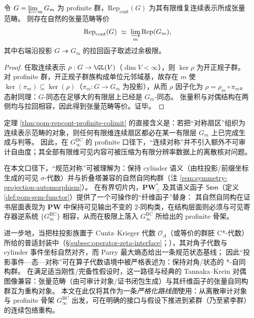 \begin{theorem}\label{thm:pom-repcont-profinite-colimit}
令 \(G=\varprojlim_m G_m\) 为 profinite 群，\(\mathrm{Rep}_{\mathrm{cont}}(G)\) 为其有限维复连续表示所成张量范畴。
则存在自然的张量范畴等价
\[
\mathrm{Rep}_{\mathrm{cont}}(G)\ \simeq\ \varinjlim_m \mathrm{Rep}(G_m),
\]
其中右端沿投影 \(G\twoheadrightarrow G_m\) 的拉回函子取滤过余极限。
\end{theorem}
\begin{proof}
任取连续表示 \(\rho:G\to\GL(V)\)（\(\dim V<\infty\)），则 \(\ker\rho\) 为开正规子群。
对 profinite 群，开正规子群族构成单位元邻域基，故存在 \(m\) 使 \(\ker(\pi_m)\subseteq\ker(\rho)\)（\(\pi_m:G\to G_m\) 为投影），从而 \(\rho\) 因子化为 \(\rho=\rho_m\circ \pi_m\)。
态射同理：\(G\)-同态在足够大的有限层上已经是 \(G_m\)-同态。
张量积与对偶结构在两侧均与拉回相容，因此得到张量范畴等价。证毕。
\end{proof}

\begin{remark}\label{rem:pom-profinite-sector-generated-by-finite-layers}
定理 \ref{thm:pom-repcont-profinite-colimit} 的直接含义是：若把“对称扇区”组织为连续表示范畴的对象，则任何有限维连续扇区都必在某一有限层 \(G_m\) 上已完成生成与判等。
因此，在 \(G_\infty^{\mathrm{BC}}\) 的 profinite 口径下，“连续对称”并不引入额外不可审计自由度；其全部有限维可见内容可被压缩为有限分辨率数据上的离散核对问题。
\end{remark}

\begin{remark}\label{rem:pom-tannaka-krein-roadmap}
在本文口径下，“规范对称”可被理解为：保持 cylinder 语义（由柱投影/前缀坐标生成的可见 \(\sigma\)-代数）并与折叠塔兼容的自然自同构群（注 \ref{rem:symmetry-projection-automorphism}）。
在有界切片内，\(\mathbf{PW}^{\ast}_{\le}\) 及其语义函子 \(\mathsf{Sem}\)（定义 \ref{def:pom-sem-functor}）提供了一个可操作的“纤维函子”替身：
其自然自同构在证书层面表现为 \(\mathbf{PW}\) 中保持可见输出不变的 \(2\)-同构类，在结构层面则必须与可见寄存器逆系统 \(\{G_m^{\mathrm{BC}}\}\) 相容，从而在极限上落入 \(G_\infty^{\mathrm{BC}}\) 所给出的 profinite 骨架。
\par
进一步地，当把柱投影族置于 Cuntz--Krieger 代数 \(\mathcal{O}_A\)（或等价的群胚 C*-代数）所给的普适封装中（\S\ref{subsec:operator-zeta-interface}；\cite{CuntzKrieger1980}），其对角子代数与 cylinder 事件坐标自然对齐，而 Parry 最大熵态给出一条规范状态基线；
因此“投影事件—态—对称”可在算子代数语境中被严格表述为：保持对角/状态的 *-自同构群。
在满足适当刚性/完备性假设时，这一路径与经典的 Tannaka--Krein 对偶图像兼容：张量范畴（由可审计对象/证书闭包生成）与其纤维函子的张量自同构群互为重构对象。
本文在此仅将其作为一条\emph{严格化路线图}使用：从离散审计对象与 profinite 骨架 \(G_\infty^{\mathrm{BC}}\) 出发，可在明确的接口与假设下推进到紧群（乃至紧李群）的连续包络重构。
\end{remark}

